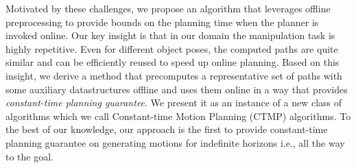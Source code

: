 \documentclass[a4paper]{report}
\begin{document}
Motivated by these challenges, we propose an algorithm that leverages offline preprocessing to provide bounds on the planning time when the planner is invoked online. Our key insight is that in our domain the manipulation task is highly repetitive. Even for different object poses, the computed paths are quite similar and can be efficiently reused to speed up online planning. Based on this insight, we derive a method that precomputes a representative set of paths with some auxiliary datastructures offline and uses them online in a way that provides \emph{constant-time planning guarantee}.
We present it as an instance of a new class of algorithms which we call Constant-time Motion Planning (CTMP) algorithms.
To the best of our knowledge, our approach is the first to provide constant-time planning guarantee on generating motions for indefinite horizons i.e., all the way to the goal.
\end{document}
